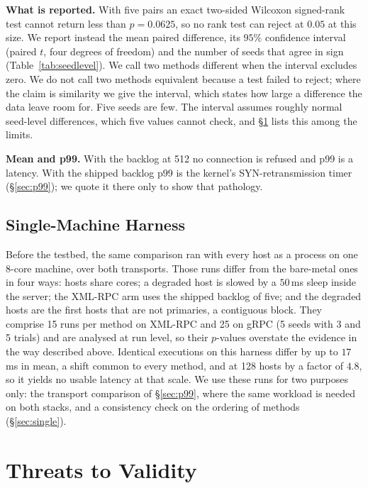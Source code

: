 \documentclass[journal]{IEEEtran}
\begin{document}
\textbf{What is reported.} With five pairs an exact two-sided Wilcoxon
signed-rank test cannot return less than $p = 0.0625$, so no rank test can
reject at $0.05$ at this size. We report instead the mean paired difference, its
$95\%$ confidence interval (paired $t$, four degrees of freedom) and the number
of seeds that agree in sign (Table~\ref{tab:seedlevel}). We call two methods
different when the interval excludes zero. We do not call two methods equivalent
because a test failed to reject; where the claim is similarity we give the
interval, which states how large a difference the data leave room for. Five
seeds are few. The interval assumes roughly normal seed-level differences, which
five values cannot check, and \S\ref{sec:threats} lists this among the limits.

\textbf{Mean and p99.} With the backlog at 512 no connection is refused and p99
is a latency. With the shipped backlog p99 is the kernel's SYN-retransmission
timer (\S\ref{sec:p99}); we quote it there only to show that pathology.

\subsection{Single-Machine Harness}
\label{sec:harness}

Before the testbed, the same comparison ran with every host as a process on one
8-core machine, over both transports. Those runs differ from the bare-metal ones
in four ways: hosts share cores; a degraded host is slowed by a $50$\,ms sleep
inside the server; the XML-RPC arm uses the shipped backlog of five; and the
degraded hosts are the first hosts that are not primaries, a contiguous block.
They comprise 15 runs per method on XML-RPC and 25 on gRPC (5 seeds with 3 and 5
trials) and are analysed at run level, so their $p$-values overstate the
evidence in the way described above. Identical executions on this harness differ
by up to $17$\,ms in mean, a shift common to every method, and at 128 hosts by
a factor of $4.8$, so it yields no usable latency at that scale. We use these runs for two purposes only: the
transport comparison of \S\ref{sec:p99}, where the same workload is needed on
both stacks, and a consistency check on the ordering of methods
(\S\ref{sec:single}).





\section{Threats to Validity}
\label{sec:threats}
\end{document}
